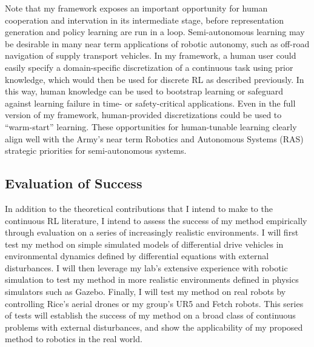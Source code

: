 \documentclass[10pt]{article}
\begin{document}
Note that my framework exposes an important opportunity for human cooperation
and intervation in its intermediate stage, before representation generation and
policy learning are run in a loop. Semi-autonomous learning may be desirable in
many near term applications of robotic autonomy, such as off-road navigation of
supply transport vehicles. In my framework, a human user could easily specify a
domain-specific discretization of a continuous task using prior knowledge,
which would then be used for discrete RL as described previously. In this way, human
knowledge can be used to bootstrap learning or safeguard against learning
failure in time- or safety-critical applications. Even in the full version of my
framework, human-provided discretizations could be used to ``warm-start''
learning. These opportunities for human-tunable learning clearly align well with
the Army's near term Robotics and Autonomous Systems (RAS) strategic
priorities for semi-autonomous systems.

\subsection*{Evaluation of Success}
In addition to the theoretical contributions that I intend to make to the
continuous RL literature, I intend to assess the success of my method
empirically through evaluation on a series of increasingly realistic
environments. I will first test my method on simple simulated models of
differential drive vehicles in environmental dynamics defined by differential
equations with external disturbances. I will then leverage my lab's extensive
experience with robotic simulation to test my method in more realistic
environments defined in physics simulators such as Gazebo. Finally, I will test
my method on real robots by controlling Rice's aerial drones or my group's UR5
and Fetch robots. This series of tests will establish the success of my method
on a broad class of continuous problems with external disturbances, and show
the applicability of my proposed method to robotics in the real world.
\end{document}
